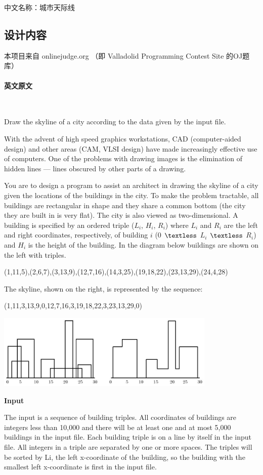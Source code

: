 \documentclass[a4paper]{ctexart}
\begin{document}
	中文名称：城市天际线
	\subsection{设计内容}
	本项目来自 onlinejudge.org （即 Valladolid Programming Contest Site 的OJ题库）
	\paragraph{英文原文}~

	Draw the skyline of a city according to the data given by the input file.
	
	With the advent of high speed graphics workstations, CAD (computer-aided design) and other areas (CAM, VLSI design) have made increasingly effective use of computers. One of the problems with drawing images is the elimination of hidden lines — lines obscured by other parts of a drawing.

	You are to design a program to assist an architect in drawing the skyline of a city given the locations of the buildings in the city. To make the problem tractable, all buildings are rectangular in shape and they share a common bottom (the city they are built in is very flat). The city is also viewed as two-dimensional. A building is specified by an ordered triple ($L_i$, $H_i$, $R_i$) where $L_i$ and $R_i$ are the left and right coordinates, respectively, of building $i$ (0 $\textless$  $L_i$ $\textless$  $R_i$) and $H_i$ is the height of the building. In the diagram below buildings are shown on the left with triples.

	(1,11,5),(2,6,7),(3,13,9),(12,7,16),(14,3,25),(19,18,22),(23,13,29),(24,4,28)

	The skyline, shown on the right, is represented by the sequence:

	(1,11,3,13,9,0,12,7,16,3,19,18,22,3,23,13,29,0)

	\includegraphics[width=10.465cm,height=3.577cm]{effect.jpg}

	\textbf{Input}

	The input is a sequence of building triples. All coordinates of buildings are integers less than 10,000 and there will be at least one and at most 5,000 buildings in the input file. Each building triple is on a line by itself in the input file. All integers in a triple are separated by one or more spaces. The triples will be sorted by Li, the left x-coordinate of the building, so the building with the smallest left x-coordinate is first in the input file.
\end{document}
